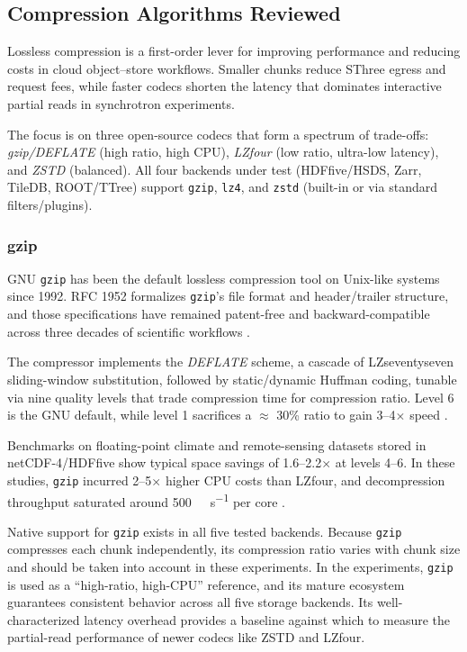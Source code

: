 \documentclass[nomenclature, english, bibtex]{kththesis}
\numberwithin{listing}{chapter}
\begin{document}
\subsection{Compression Algorithms Reviewed}
\label{sec:compression-algorithms}
Lossless compression is a first-order lever for improving performance and reducing costs in cloud object–store workflows. Smaller chunks reduce \gls{SThree} egress and request fees, while faster codecs shorten the latency that dominates interactive partial reads in synchrotron experiments.

The focus is on three open-source codecs that form a spectrum of trade-offs: \emph{gzip/DEFLATE} (high ratio, high \gls{CPU}), \emph{\gls{LZfour}} (low ratio, ultra-low latency), and \emph{\gls{ZSTD}} (balanced). All four backends under test (\gls{HDFfive}/\gls{HSDS}, Zarr, TileDB, \gls{ROOT}/\gls{TTree}) support \texttt{gzip}, \texttt{lz4}, and \texttt{zstd} (built-in or via standard filters/plugins).

\subsubsection{gzip}
\label{sec:compression-gzip}
GNU \texttt{gzip} has been the default lossless compression tool on Unix-like systems since 1992. \gls{RFC} 1952 formalizes \texttt{gzip}’s file format and header/trailer structure, and those specifications have remained patent-free and backward-compatible across three decades of scientific workflows \cite{deutsch1996rfc1952}.

The compressor implements the \emph{DEFLATE} scheme, a cascade of \gls{LZseventyseven} sliding-window substitution, followed by static/dynamic Huffman coding, tunable via nine quality levels that trade compression time for compression ratio. Level 6 is the GNU default, while level 1 sacrifices a \(\approx\) 30\% ratio to gain 3–4\(\times\) speed \cite{deutsch1996rfc1952}.

Benchmarks on floating-point climate and remote-sensing datasets stored in \gls{netCDF}-4/\gls{HDFfive} show typical space savings of 1.6–2.2\(\times\) at levels 4–6. In these studies, \texttt{gzip} incurred 2–5\(\times\) higher \gls{CPU} costs than \gls{LZfour}, and decompression throughput saturated around \SI{500}{\mega\byte\per\second} per core \cite{delaunay2019evaluation,chen2023fcbench}.

Native support for \texttt{gzip} exists in all five tested backends. Because \texttt{gzip} compresses each chunk independently, its compression ratio varies with chunk size and should be taken into account in these experiments. In the experiments, \texttt{gzip} is used as a “high-ratio, high-\gls{CPU}” reference, and its mature ecosystem guarantees consistent behavior across all five storage backends. Its well-characterized latency overhead provides a baseline against which to measure the partial-read performance of newer codecs like \gls{ZSTD} and \gls{LZfour}.
\end{document}
